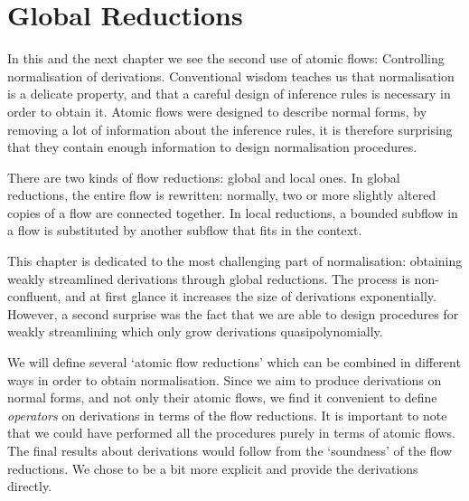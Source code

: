 \chapter{Global Reductions}\label{chapter:GlobalReductions}


In this and the next chapter we see the second use of atomic flows: Controlling normalisation of derivations. Conventional wisdom teaches us that normalisation is a delicate property, and that a careful design of inference rules is necessary in order to obtain it. Atomic flows were designed to describe normal forms, by removing a lot of information about the inference rules, it is therefore surprising that they contain enough information to design normalisation procedures.

There are two kinds of flow reductions: global and local ones. In global reductions, the entire flow is rewritten: normally, two or more slightly altered copies of a flow are connected together. In local reductions, a bounded subflow in a flow is substituted by another subflow that fits in the context.

This chapter is dedicated to the most challenging part of normalisation: obtaining weakly streamlined derivations through global reductions. The process is non-confluent, and at first glance it increases the size of derivations exponentially. However, a second surprise was the fact that we are able to design procedures for weakly streamlining which only grow derivations quasipolynomially.

We will define several `atomic flow reductions' which can be combined in different ways in order to obtain normalisation. Since we aim to produce derivations on normal forms, and not only their atomic flows, we find it convenient to define \emph{operators} on derivations in terms of the flow reductions. It is important to note that we could have performed all the procedures purely in terms of atomic flows. The final results about derivations would follow from the `soundness' of the flow reductions. We chose to be a bit more explicit and provide the derivations directly.


